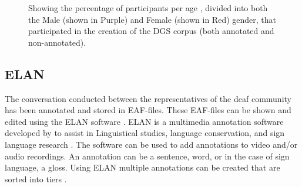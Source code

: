 \begin{figure}[h]
\caption{Showing the percentage of participants per age , divided into both the Male (shown in Purple) and Female (shown in Red) gender,  that participated in the creation of the DGS corpus (both annotated and non-annotated). \cite{age_data_hamburg}}

\label{fig:bundeslander}
\end{figure}

\subsection{ELAN}
The conversation conducted between the representatives of the deaf community has been annotated and stored in EAF-files. These EAF-files can be shown and edited using the ELAN software \cite{crasborn2008enhanced}. ELAN is a multimedia annotation software developed by \citep{elan_software} to assist in Linguistical studies, language conservation, and sign language research \cite{brugman2004annotating}. The software can be used to add annotations to video and/or audio recordings. An annotation can be a sentence, word, or in the case of sign language, a gloss. Using ELAN multiple annotations can be created that are sorted into tiers \cite{crasborn2008enhanced}.  

